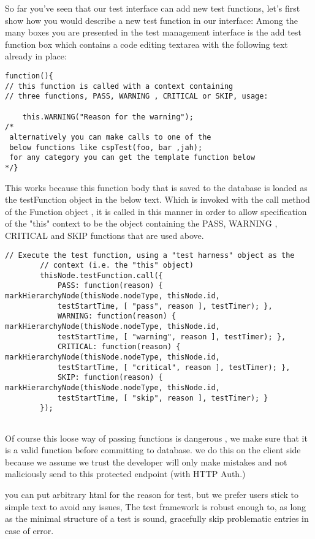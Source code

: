 So far you've seen that our test interface can add new test functions, let's first show how you would describe a new test function in our interface:
Among the many boxes you are presented in the test management interface is the add test function box which contains a code editing textarea with the following
text already in place:
\begin{verbatim}
function(){
// this function is called with a context containing
// three functions, PASS, WARNING , CRITICAL or SKIP, usage:

	this.WARNING("Reason for the warning");
/*
 alternatively you can make calls to one of the 
 below functions like cspTest(foo, bar ,jah); 
 for any category you can get the template function below
*/} 
\end{verbatim}

This works because this function body that is saved to the database is loaded as the testFunction object in the below text.
Which is invoked with the call method of the Function object , it is called in this manner in order to allow specification
of the "this" context to be the object containing the PASS, WARNING , CRITICAL and SKIP functions that are used above. 

\begin{verbatim}
// Execute the test function, using a "test harness" object as the
		// context (i.e. the "this" object)
		thisNode.testFunction.call({
			PASS: function(reason) { markHierarchyNode(thisNode.nodeType, thisNode.id,
			testStartTime, [ "pass", reason ], testTimer); },
			WARNING: function(reason) { markHierarchyNode(thisNode.nodeType, thisNode.id, 
			testStartTime, [ "warning", reason ], testTimer); },
			CRITICAL: function(reason) { markHierarchyNode(thisNode.nodeType, thisNode.id,
			testStartTime, [ "critical", reason ], testTimer); },
			SKIP: function(reason) { markHierarchyNode(thisNode.nodeType, thisNode.id, 
			testStartTime, [ "skip", reason ], testTimer); }
		});
	      
\end{verbatim}

Of course this loose way of passing functions is dangerous , we make sure that it is a valid function before  committing to database.
we do this on the client side because we assume we trust the developer will only make mistakes and not maliciously send to this 
protected endpoint (with HTTP Auth.)

you can put arbitrary html for the reason for test, but we prefer users stick to simple text to avoid any issues, 
The test framework is robust enough to, as long as the minimal structure of a test is sound, gracefully skip problematic entries in case of error.


